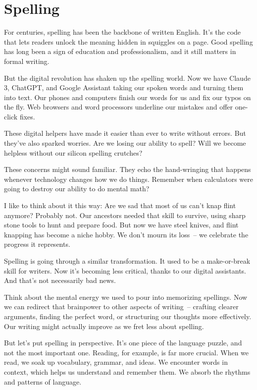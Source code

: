 \section{Spelling}

For centuries, spelling has been the backbone of written English. It's the code that lets readers unlock the meaning hidden in squiggles on a page. Good spelling has long been a sign of education and professionalism, and it still matters in formal writing.

But the digital revolution has shaken up the spelling world. Now we have Claude 3, ChatGPT, and Google Assistant taking our spoken words and turning them into text. Our phones and computers finish our words for us and fix our typos on the fly. Web browsers and word processors underline our mistakes and offer one-click fixes.

These digital helpers have made it easier than ever to write without errors. But they've also sparked worries. Are we losing our ability to spell? Will we become helpless without our silicon spelling crutches?

These concerns might sound familiar. They echo the hand-wringing that happens whenever technology changes how we do things. Remember when calculators were going to destroy our ability to do mental math?

I like to think about it this way: Are we sad that most of us can't knap flint anymore? Probably not. Our ancestors needed that skill to survive, using sharp stone tools to hunt and prepare food. But now we have steel knives, and flint knapping has become a niche hobby. We don't mourn its loss~-- we celebrate the progress it represents.

Spelling is going through a similar transformation. It used to be a make-or-break skill for writers. Now it's becoming less critical, thanks to our digital assistants. And that's not necessarily bad news.

Think about the mental energy we used to pour into memorizing spellings. Now we can redirect that brainpower to other aspects of writing~-- crafting clearer arguments, finding the perfect word, or structuring our thoughts more effectively. Our writing might actually improve as we fret less about spelling.

But let's put spelling in perspective. It's one piece of the language puzzle, and not the most important one. Reading, for example, is far more crucial. When we read, we soak up vocabulary, grammar, and ideas. We encounter words in context, which helps us understand and remember them. We absorb the rhythms and patterns of language.

